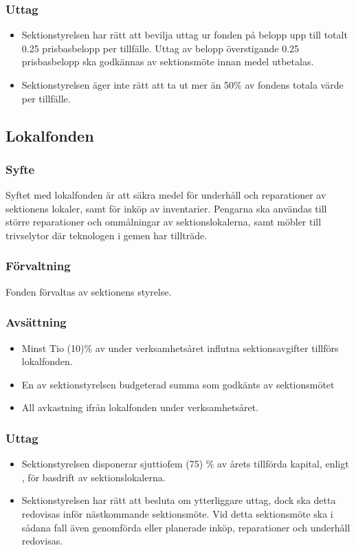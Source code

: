 \documentclass[a4paper]{dtek}
\newcommand{\prisbasbelopp}[1]{
    #1 prisbasbelopp
    \ifdef{\nuvarandeprisbasbelopp}{
        \marginpar{
            \small{ \textbf{\roundandprint{\xintiexpr#1 * \nuvarandeprisbasbelopp\relax}kr}}
        }
    }{}
}
\begin{document}
\subsubsection{Uttag}
\begin{itemize}
\item Sektionstyrelsen har rätt att bevilja uttag ur fonden på belopp upp till totalt \prisbasbelopp{0.25} per tillfälle. Uttag av belopp överstigande \prisbasbelopp{0.25} ska godkännas av sektionsmöte innan medel utbetalas.
\item Sektionstyrelsen äger inte rätt att ta ut mer än 50\% av fondens totala värde per tillfälle.
\end{itemize}

\subsection{Lokalfonden}
\subsubsection{Syfte}
\label{sec:lokalfond_syfte}
Syftet med lokalfonden är att säkra medel för underhåll och reparationer av sektionens lokaler, samt för inköp av inventarier. Pengarna ska användas till större reparationer och ommålningar av sektionslokalerna, samt möbler till trivselytor där teknologen i gemen har tillträde.
\subsubsection{Förvaltning}
Fonden förvaltas av sektionens styrelse.
\subsubsection{Avsättning}
\label{sec:lokalfond_avsattning}
\begin{itemize}
\item Minst Tio (10)\% av under verksamhetsåret influtna sektionsavgifter tillförs lokalfonden.
\item En av sektionstyrelsen budgeterad summa som godkänts av sektionsmötet
\item All avkastning ifrån lokalfonden under verksamhetsåret.
\end{itemize}
\subsubsection{Uttag}
\begin{itemize}
\item Sektionstyrelsen disponerar sjuttiofem (75) \% av årets tillförda kapital,
enligt , för basdrift av sektionslokalerna.
\item Sektionstyrelsen har rätt att besluta om ytterliggare uttag, dock ska detta redovisas inför nästkommande sektionsmöte. Vid detta sektionsmöte ska i sådana fall även genomförda eller planerade inköp, reparationer och underhåll redovisas.
\end{itemize}
\end{document}
